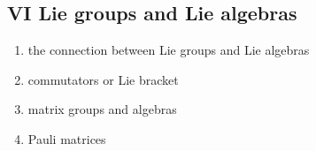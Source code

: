 \documentclass[12pt]{article}
\begin{document}
\subsection*{VI Lie groups and Lie algebras}
\begin{enumerate}
\item the connection between Lie groups and Lie algebras
\item commutators or Lie bracket
\item matrix groups and algebras
\item Pauli matrices
 
\end{enumerate}
\end{document}
